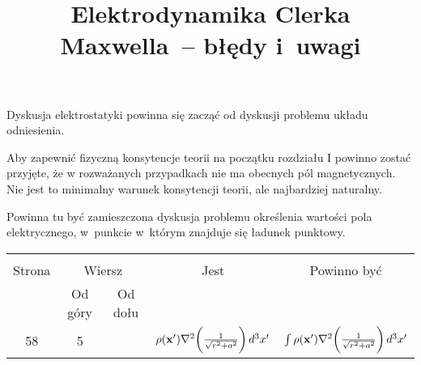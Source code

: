 \documentclass[a4paper,11pt]{article}
\title{Elektrodynamika Clerka Maxwella~-- błędy i~uwagi}
\begin{document}





\maketitle %









Dyskusja elektrostatyki powinna się zacząć od dyskusji problemu układu
odniesienia.

\vspace{\spaceFour}



Aby zapewnić fizyczną konsytencje teorii na początku rozdziału I
powinno zostać przyjęte, że w rozważanych przypadkach nie ma obecnych
pól magnetycznych. Nie jest to minimalny warunek konsytencji teorii,
ale najbardziej naturalny.

\vspace{\spaceFour}








 Powinna tu być zamieszczona dyskusja problemu określenia wartości
pola elektrycznego, w~punkcie w~którym znajduje się ładunek punktowy.







\begin{center}

  \begin{tabular}{|c|c|c|c|c|}
    \hline
    & \multicolumn{2}{c|}{} & & \\
    Strona & \multicolumn{2}{c|}{Wiersz} & Jest
                              & Powinno być \\ \cline{2-3}
    & Od góry & Od dołu & & \\
    \hline
    58 & 5 & & $\rho( \bold{ x }' ) \nabla^{ 2 } \bigg( \frac{ 1 }{ \sqrt{ r^{ 2 } + a^{ 2 } } } \bigg) \, d^{ 3 } x'$ & $\int \rho( \bold{ x }' ) \nabla^{ 2 } \bigg( \frac{ 1 }{ \sqrt{ r^{ 2 } + a^{ 2 } } } \bigg) \, d^{ 3 } x'$ \\
    \hline
  \end{tabular}

\end{center}
\end{document}

